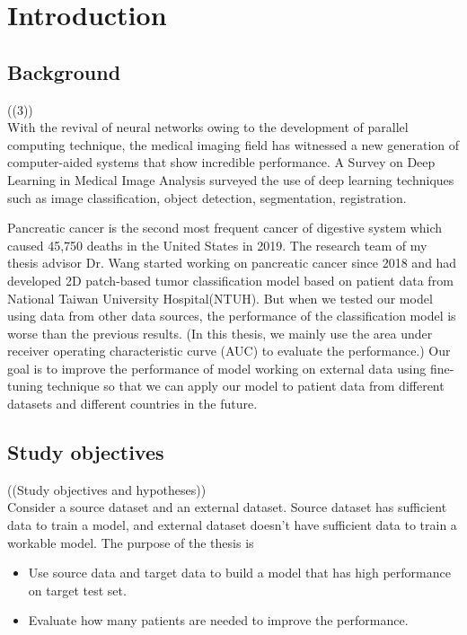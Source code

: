 \chapter{Introduction}
\section{Background}
((3))\\
With the revival of neural networks owing to the development of parallel computing technique, the medical imaging field has witnessed a new generation of computer-aided systems that show incredible performance. A Survey on Deep Learning in Medical Image Analysis \cite{litjens2017survey}surveyed the use of deep learning techniques such as image classification, object detection, segmentation, registration. 








Pancreatic cancer is the second most frequent cancer of digestive system which caused 45,750 deaths in the United States in 2019\cite{siegel2019cancer}. The research team of my thesis advisor Dr. Wang started working on pancreatic cancer since 2018 and had developed 2D patch-based tumor classification model based on patient data from National Taiwan University Hospital(NTUH). But when we tested our model using data from other data sources, the performance of the classification model is worse than the previous results. (In this thesis, we mainly use the area under receiver operating characteristic curve (AUC) to evaluate the performance.) Our goal is to improve the performance of model working on external data using fine-tuning technique so that we can apply our model to patient data from different datasets and different countries in the future.

\section{Study objectives}
((Study objectives and hypotheses))\\
Consider a source dataset and an external dataset. Source dataset has sufficient data to train a model, and external dataset doesn't have sufficient data to train a workable model. The purpose of the thesis is
\begin{itemize}
    \item Use source data and target data to build a model that has high performance on target test set.
    \item Evaluate how many patients are needed to improve the performance.
\end{itemize}

